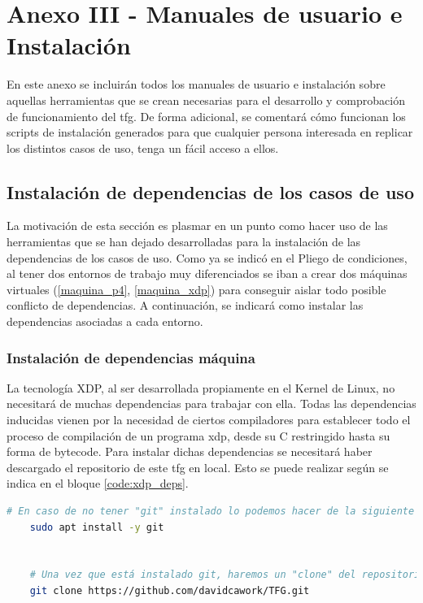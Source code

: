 \chapter{Anexo III - Manuales de usuario e Instalación}

En este anexo se incluirán todos los manuales de usuario e instalación sobre aquellas herramientas que se crean necesarias para el desarrollo y comprobación de funcionamiento del \gls{tfg}. De forma adicional, se comentará cómo funcionan los scripts de instalación generados para que cualquier persona interesada en replicar los distintos casos de uso, tenga un fácil acceso a ellos.

\section{Instalación de dependencias de los casos de uso}
\label{deps}

La motivación de esta sección es plasmar en un punto como hacer uso de las herramientas que se han dejado desarrolladas para la instalación de las dependencias de los casos de uso. Como ya se indicó en el Pliego de condiciones, al tener dos entornos de trabajo muy diferenciados se iban a crear dos máquinas virtuales (\ref{maquina_p4}, \ref{maquina_xdp})  para conseguir aislar todo posible conflicto de dependencias. A continuación, se indicará como instalar las dependencias asociadas a cada entorno.

\subsection{Instalación de dependencias máquina }

La tecnología XDP, al ser desarrollada propiamente en el Kernel de Linux, no necesitará de muchas dependencias para trabajar con ella. Todas las dependencias inducidas vienen por la necesidad de ciertos compiladores para establecer todo el proceso de compilación de un programa \gls{xdp}, desde su C restringido hasta su forma de bytecode. Para instalar dichas dependencias se necesitará haber descargado el repositorio de este \gls{tfg} en local. Esto se puede realizar según se indica en el bloque \ref{code:xdp_deps}.

\begin{lstlisting}[language= bash, style=Consola, caption={Descarga del repositorio del TFG},label=code:xdp_deps]
    # En caso de no tener "git" instalado lo podemos hacer de la siguiente forma
    sudo apt install -y git
    
    
    # Una vez que está instalado git, haremos un "clone" del repositorio
    git clone https://github.com/davidcawork/TFG.git
\end{lstlisting}


